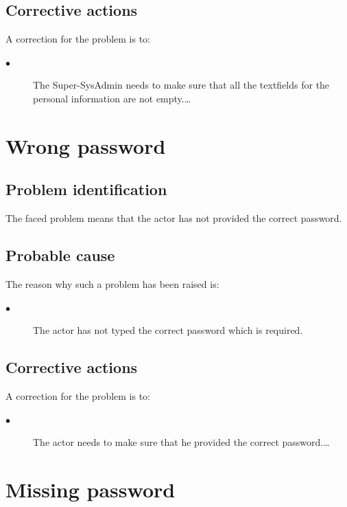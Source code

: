 \subsection{Corrective actions}

A correction for the problem is to:\\
\begin{description}
\item[$\bullet$] The Super-SysAdmin needs to make sure that all the textfields
for the personal information are not empty.\ldots

\end{description}


\section{Wrong password} 

\subsection{Problem identification}
The faced problem means that the actor has not provided the correct password.

\subsection{Probable cause}

The reason why such a problem has been raised is:\\
\begin{description}
\item[$\bullet$] The actor has not typed the correct password which is
required.
\end{description}


\subsection{Corrective actions}

A correction for the problem is to:\\
\begin{description}
\item[$\bullet$] The actor needs to make sure that he provided the correct
password.\ldots

\end{description}



\section{Missing password} 


